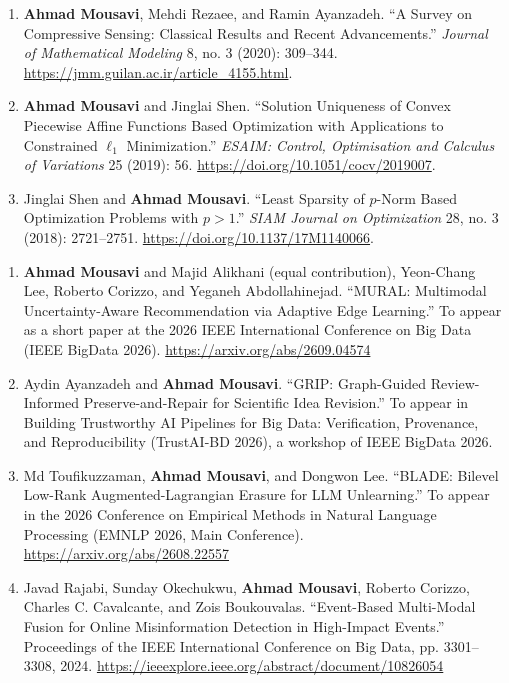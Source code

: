 \documentclass[letterpaper,11pt]{article}
\newcommand{\resheading}[1]{\par\vspace{0.6em}\noindent{\large\textbf{#1}}\par\vspace{0.25em}}
\begin{document}
\begin{enumerate}
\item[3.] \textbf{Ahmad Mousavi}, Mehdi Rezaee, and Ramin Ayanzadeh. ``A Survey on Compressive Sensing: Classical Results and Recent Advancements.'' \textit{Journal of Mathematical Modeling} 8, no. 3 (2020): 309--344. \url{https://jmm.guilan.ac.ir/article_4155.html}.

\item[2.] \textbf{Ahmad Mousavi} and Jinglai Shen. ``Solution Uniqueness of Convex Piecewise Affine Functions Based Optimization with Applications to Constrained $\ell_1$ Minimization.'' \textit{ESAIM: Control, Optimisation and Calculus of Variations} 25 (2019): 56. \url{https://doi.org/10.1051/cocv/2019007}.

\item[1.] Jinglai Shen and \textbf{Ahmad Mousavi}. ``Least Sparsity of $p$-Norm Based Optimization Problems with $p>1$.'' \textit{SIAM Journal on Optimization} 28, no. 3 (2018): 2721--2751. \url{https://doi.org/10.1137/17M1140066}.
\end{enumerate}

\resheading{\large{Conference Papers}}
\begin{enumerate}
\item[4.] \textbf{Ahmad Mousavi} and Majid Alikhani (equal contribution), Yeon-Chang Lee, Roberto Corizzo, and Yeganeh Abdollahinejad. ``MURAL: Multimodal Uncertainty-Aware Recommendation via Adaptive Edge Learning.'' To appear as a short paper at the 2026 IEEE International Conference on Big Data (IEEE BigData 2026). \url{https://arxiv.org/abs/2609.04574}

\item[3.] Aydin Ayanzadeh and \textbf{Ahmad Mousavi}. ``GRIP: Graph-Guided Review-Informed Preserve-and-Repair for Scientific Idea Revision.'' To appear in Building Trustworthy AI Pipelines for Big Data: Verification, Provenance, and Reproducibility (TrustAI-BD 2026), a workshop of IEEE BigData 2026.

\item[2.] Md Toufikuzzaman, \textbf{Ahmad Mousavi}, and Dongwon Lee. ``BLADE: Bilevel Low-Rank Augmented-Lagrangian Erasure for LLM Unlearning.'' To appear in the 2026 Conference on Empirical Methods in Natural Language Processing (EMNLP 2026, Main Conference). \url{https://arxiv.org/abs/2608.22557}

\item[1.] Javad Rajabi, Sunday Okechukwu, \textbf{Ahmad Mousavi}, Roberto Corizzo, Charles C. Cavalcante, and Zois Boukouvalas. ``Event-Based Multi-Modal Fusion for Online Misinformation Detection in High-Impact Events.'' Proceedings of the IEEE International Conference on Big Data, pp. 3301--3308, 2024. \url{https://ieeexplore.ieee.org/abstract/document/10826054}
\end{enumerate}
\end{document}
